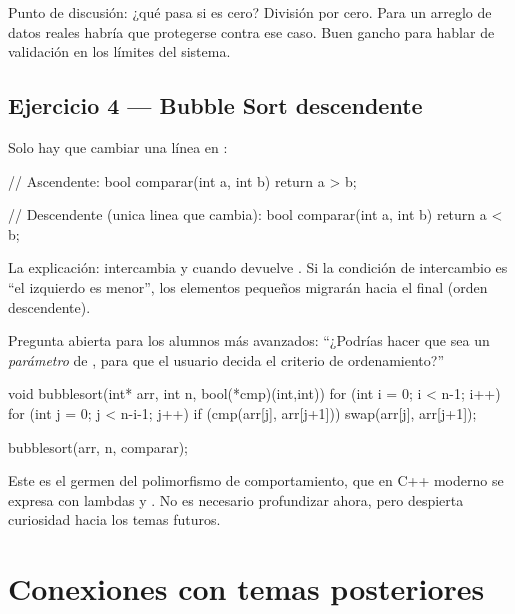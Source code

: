 \documentclass[12pt, oneside]{article}
\begin{document}
\begin{notaprofesor}
  Punto de discusión: ¿qué pasa si  es cero? División por cero.
  Para un arreglo de datos reales habría que protegerse contra ese caso.
  Buen gancho para hablar de validación en los límites del sistema.
\end{notaprofesor}

\subsection{Ejercicio 4 — Bubble Sort descendente}

Solo hay que cambiar una línea en :

\begin{codigo}
// Ascendente:
bool comparar(int a, int b) { return a > b; }

// Descendente (unica linea que cambia):
bool comparar(int a, int b) { return a < b; }
\end{codigo}

La explicación:  intercambia  y 
cuando  devuelve . Si la condición de intercambio es
``el izquierdo es menor'', los elementos pequeños migrarán hacia el final
(orden descendente).

\begin{notaprofesor}
  Pregunta abierta para los alumnos más avanzados: ``¿Podrías hacer que
   sea un \textit{parámetro} de , para que
  el usuario decida el criterio de ordenamiento?''
  \begin{codigo}
  void bubblesort(int* arr, int n, bool(*cmp)(int,int)) {
      for (int i = 0; i < n-1; i++)
          for (int j = 0; j < n-i-1; j++)
              if (cmp(arr[j], arr[j+1]))
                  swap(arr[j], arr[j+1]);
  }

  bubblesort(arr, n, comparar);
  \end{codigo}
  Este es el germen del polimorfismo de comportamiento, que en C++ moderno
  se expresa con lambdas y . No es necesario profundizar
  ahora, pero despierta curiosidad hacia los temas futuros.
\end{notaprofesor}

\section{Conexiones con temas posteriores}
\end{document}
